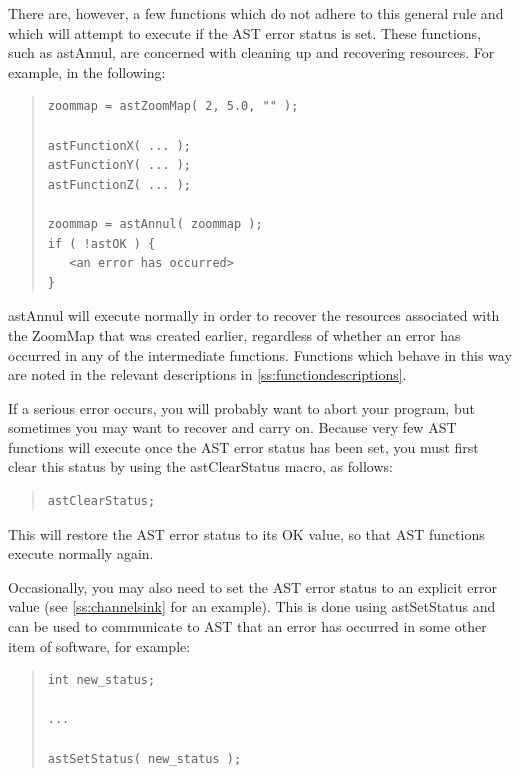 \documentclass[twoside,11pt]{article}
\newcommand{\htmlref}[2]{#1}
\newcommand{\appref}[1]{Appendix~\ref{#1}}
\newcommand{\secref}[1]{\S\ref{#1}}
\renewcommand{\appref}[1]{\ref{#1}}
\renewcommand{\secref}[1]{\ref{#1}}
\begin{document}
There are, however, a few functions which do not adhere to this
general rule and which will attempt to execute if the AST error status
is set. These functions, such as \htmlref{astAnnul}{astAnnul}, are concerned with cleaning
up and recovering resources. For example, in the following:

\begin{quote}
\small
\begin{verbatim}
zoommap = astZoomMap( 2, 5.0, "" );

astFunctionX( ... );
astFunctionY( ... );
astFunctionZ( ... );

zoommap = astAnnul( zoommap );
if ( !astOK ) {
   <an error has occurred>
}
\end{verbatim}
\normalsize
\end{quote}

astAnnul will execute normally in order to recover the resources
associated with the ZoomMap that was created earlier, regardless of
whether an error has occurred in any of the intermediate functions.
Functions which behave in this way are noted in the relevant
descriptions in \appref{ss:functiondescriptions}.

If a serious error occurs, you will probably want to abort your
program, but sometimes you may want to recover and carry on. Because
very few AST functions will execute once the AST error status has been
set, you must first clear this status by using the \htmlref{astClearStatus}{astClearStatus}
macro, as follows:

\begin{quote}
\small
\begin{verbatim}
astClearStatus;
\end{verbatim}
\normalsize
\end{quote}

This will restore the AST error status to its OK value, so that AST
functions execute normally again.

Occasionally, you may also need to set the AST error status to an
explicit error value (see \secref{ss:channelsink} for an
example). This is done using \htmlref{astSetStatus}{astSetStatus} and can be used to
communicate to AST that an error has occurred in some other item of
software, for example:

\begin{quote}
\small
\begin{verbatim}
int new_status;

...

astSetStatus( new_status );
\end{verbatim}
\normalsize
\end{quote}
\end{document}
